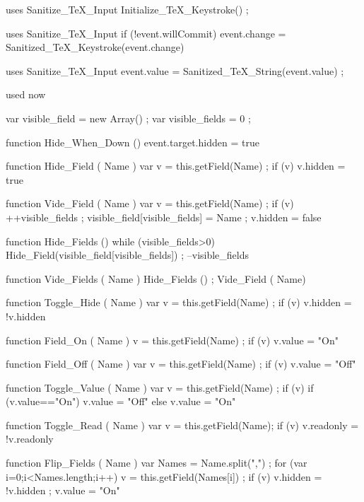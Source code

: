 \stopJSpreamble

 uses {Sanitize_TeX_Input}
  Initialize_TeX_Keystroke() ; 
\stopJScode

 uses {Sanitize_TeX_Input}
  if (!event.willCommit) 
    { event.change = Sanitized_TeX_Keystroke(event.change) }
\stopJScode

 uses {Sanitize_TeX_Input}
  event.value = Sanitized_TeX_String(event.value) ; 
\stopJScode


 used now 

var visible_field  = new Array() ; %
var visible_fields = 0 ; 

function Hide_When_Down ()
  { event.target.hidden = true }

function Hide_Field ( Name ) 
  { var v = this.getField(Name) ; 
    if (v) 
      { %
        v.hidden = true } }

function Vide_Field ( Name ) 
  { var v = this.getField(Name) ;   
    if (v) 
      { ++visible_fields ; 
        visible_field[visible_fields] = Name ;  
        v.hidden = false } } 

function Hide_Fields () 
  { while (visible_fields>0)
      { Hide_Field(visible_field[visible_fields]) ;
        --visible_fields } } 

function Vide_Fields ( Name ) %
  { Hide_Fields () ; 
    Vide_Field ( Name) } 

function Toggle_Hide ( Name ) 
  { var v = this.getField(Name) ; 
    if (v) { v.hidden = !v.hidden } } 

function Field_On ( Name ) 
  { v = this.getField(Name) ; 
    if (v) { v.value = "On" } } 

function Field_Off ( Name ) 
  { var v = this.getField(Name) ; 
    if (v) { v.value = "Off" } }

function Toggle_Value ( Name ) 
  { var v = this.getField(Name) ;
    if (v) 
      { if (v.value=="On") 
          { v.value = "Off" }
        else 
          { v.value = "On" } } }

function Toggle_Read ( Name ) 
  { var v = this.getField(Name);   
    if (v) { v.readonly = !v.readonly } }

function Flip_Fields ( Name ) 
  { var Names = Name.split(",") ;
    for (var i=0;i<Names.length;i++)
      { v = this.getField(Names[i]) ; 
        if (v)  
          { v.hidden = !v.hidden ;
            v.value = "On" } } }

